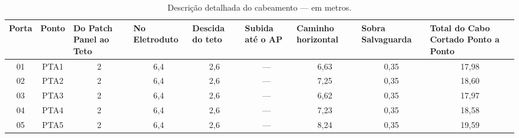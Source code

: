 \begin{table}[h!]
	\caption{Descrição detalhada do cabeamento --- em metros.}
	\label{tab9}
\begin{tabular}{|c|c|c|c|c|c|c|c|c|}
	\hline

	\textbf{Porta}     & \textbf{Ponto}     & \multicolumn{1}{l|}{\textbf{Do Patch Panel ao Teto}} & \multicolumn{1}{l|}{\textbf{No Eletroduto}} & \multicolumn{1}{l|}{\textbf{Descida do teto}} & \multicolumn{1}{l|}{\textbf{Subida até o AP}} & \multicolumn{1}{l|}{\textbf{Caminho horizontal}} & \multicolumn{1}{l|}{\textbf{Sobra Salvaguarda}} & \multicolumn{1}{l|}{\textbf{Total do Cabo Cortado Ponto a Ponto}} \\ \hline
	01                 & PTA1               & 2                                                    & 6,4                                         & 2,6                                           & ---                                           & 6,63                                             & 0,35                                            & 17,98                                                             \\ \hline
	02                 & PTA2               & 2                                                    & 6,4                                         & 2,6                                           & ---                                           & 7,25                                             & 0,35                                            & 18,60                                                             \\ \hline
	03                 & PTA3               & 2                                                    & 6,4                                         & 2,6                                           & ---                                           & 6,62                                             & 0,35                                            & 17,97                                                             \\ \hline
	04                 & PTA4               & 2                                                    & 6,4                                         & 2,6                                           & ---                                           & 7,23                                             & 0,35                                            & 18,58                                                             \\ \hline
	05                 & PTA5               & 2                                                    & 6,4                                         & 2,6                                           & ---                                           & 8,24                                             & 0,35                                            & 19,59                                                             \\ \hline

\end{tabular}
\end{table}
